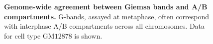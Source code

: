 \documentclass[a4paper,11pt,oneside]{book}
\begin{document}
\begin{figure}
\begin{center} 
\captionsetup{width=\textwidth}
\caption[Genome-wide agreement between Giemsa bands and A/B compartments..]{ {\bf Genome-wide agreement between Giemsa bands and A/B compartments. }
G-bands, assayed at metaphase, often correspond with interphase A/B compartments across all chromosomes. Data for cell type GM$12878$ is shown.
}\label{fig:gbands2}
\end{center}
\end{figure} 
\end{document}

